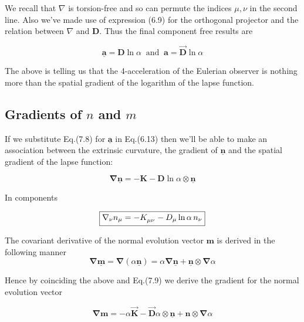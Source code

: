 \documentclass[12pt]{article}
\renewcommand{\vec}[1]{\bm{#1}}
\numberwithin{equation}{section}
\numberwithin{theorem}{subsection}
\begin{document}
We recall that $\nabla$ is torsion-free and so can permute the indices $\mu,\nu$ in the second line. Also we've made use of expression (6.9) for the orthogonal projector and the relation between $\nabla$ and $\vec{D}$. Thus the final component free results are

\begin{equation}

    \boxed{\underline{\vec{a}} = \vec{D}\ln{\alpha}} \; \; \textrm{and} \; \;  \boxed{\vec{a} = \overrightarrow{\vec{D}}\ln{\alpha}}

\end{equation}

The above is telling us that the 4-acceleration of the Eulerian observer is nothing more than the spatial gradient of the logarithm of the lapse function.


\subsection{Gradients of $n$ and $m$}

If we substitute Eq.(7.8) for $\underline{\vec{a}}$ in Eq.(6.13) then we'll be able to make an association between the extrinsic curvature, the gradient of $\underline{\vec{n}}$ and the spatial gradient of the lapse function:

\begin{equation}

   \vec{\nabla\underline{n}} = -\vec{K} - \vec{D}\ln{\alpha}\otimes\underline{\vec{n}}

\end{equation}

In components

\begin{equation*}

    \boxed{\nabla_{\nu}n_{\mu} = -\tensor{K}{_\mu_\nu} - D_{\mu}\ln{\alpha} \, n_{\nu}}

\end{equation*}

\smallskip

The covariant derivative of the normal evolution vector $\vec{m}$ is derived in the following manner $$\vec{\nabla \underline{m}} = \vec{\nabla}(\alpha\underline{\vec{n}}) = \alpha \vec{\nabla \underline{n}} + \underline{\vec{n}} \otimes \vec{\nabla}\alpha$$

Hence by coinciding the above and Eq.(7.9) we derive the gradient for the normal evolution vector

\begin{equation}

    \vec{\nabla m} = -\alpha \overrightarrow{\vec{K}} - \overrightarrow{\vec{D}}\alpha \otimes \underline{\vec{n}} + \vec{n} \otimes \vec{\nabla}\alpha

\end{equation}
\end{document}
